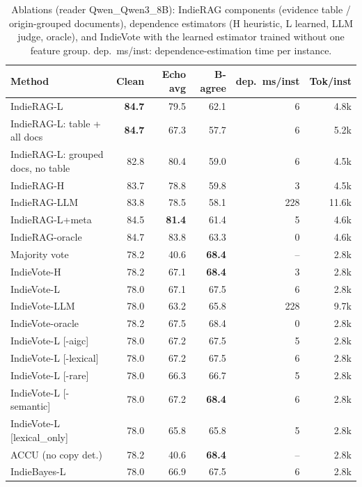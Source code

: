 \begin{table}[tbp]
\centering
\small
\caption{Ablations (reader Qwen\_Qwen3\_8B): IndieRAG components (evidence table / origin-grouped documents), dependence estimators (H heuristic, L learned, LLM judge, oracle), and IndieVote with the learned estimator trained without one feature group. dep.\ ms/inst: dependence-estimation time per instance.}
\label{tab:ablation:Qwen_Qwen3_8B}
\setlength{\tabcolsep}{4pt}
\begin{tabular}{lrrrrr}
\toprule
Method & Clean & Echo avg & B-agree & dep.\ ms/inst & Tok/inst \\
\midrule
IndieRAG-L & \textbf{84.7} & 79.5 & 62.1 & 6 & 4.8k \\
IndieRAG-L: table + all docs & \textbf{84.7} & 67.3 & 57.7 & 6 & 5.2k \\
IndieRAG-L: grouped docs, no table & 82.8 & 80.4 & 59.0 & 6 & 4.5k \\
IndieRAG-H & 83.7 & 78.8 & 59.8 & 3 & 4.5k \\
IndieRAG-LLM & 83.8 & 78.5 & 58.1 & 228 & 11.6k \\
IndieRAG-L+meta & 84.5 & \textbf{81.4} & 61.4 & 5 & 4.6k \\
IndieRAG-oracle & 84.7 & 83.8 & 63.3 & 0 & 4.6k \\
\midrule
Majority vote & 78.2 & 40.6 & \textbf{68.4} & -- & 2.8k \\
IndieVote-H & 78.2 & 67.1 & \textbf{68.4} & 3 & 2.8k \\
IndieVote-L & 78.0 & 67.1 & 67.5 & 6 & 2.8k \\
IndieVote-LLM & 78.0 & 63.2 & 65.8 & 228 & 9.7k \\
IndieVote-oracle & 78.2 & 67.5 & 68.4 & 0 & 2.8k \\
IndieVote-L [-aigc] & 78.0 & 67.2 & 67.5 & 5 & 2.8k \\
IndieVote-L [-lexical] & 78.0 & 67.2 & 67.5 & 6 & 2.8k \\
IndieVote-L [-rare] & 78.0 & 66.3 & 66.7 & 5 & 2.8k \\
IndieVote-L [-semantic] & 78.0 & 67.2 & \textbf{68.4} & 6 & 2.8k \\
IndieVote-L [lexical\_only] & 78.0 & 65.8 & 65.8 & 5 & 2.8k \\
\midrule
ACCU (no copy det.) & 78.2 & 40.6 & \textbf{68.4} & -- & 2.8k \\
IndieBayes-L & 78.0 & 66.9 & 67.5 & 6 & 2.8k \\
\bottomrule
\end{tabular}
\end{table}
